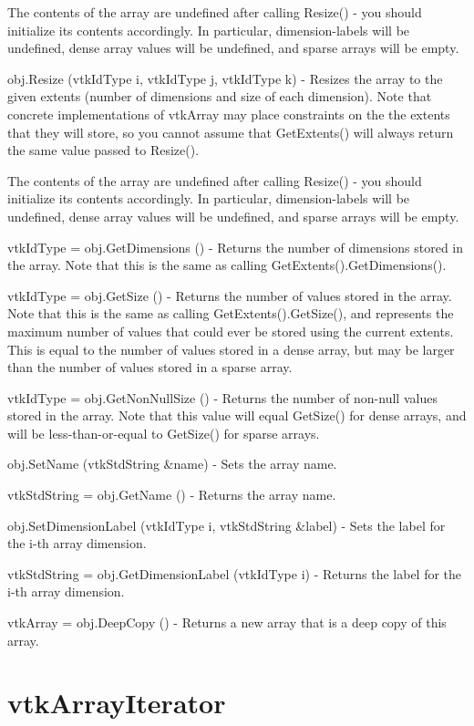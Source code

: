 \begin{DoxyItemize}
The contents of the array are undefined after calling Resize() -\/ you should initialize its contents accordingly. In particular, dimension-\/labels will be undefined, dense array values will be undefined, and sparse arrays will be empty.  
\item {\ttfamily obj.\-Resize (vtk\-Id\-Type i, vtk\-Id\-Type j, vtk\-Id\-Type k)} -\/ Resizes the array to the given extents (number of dimensions and size of each dimension). Note that concrete implementations of vtk\-Array may place constraints on the the extents that they will store, so you cannot assume that Get\-Extents() will always return the same value passed to Resize().

The contents of the array are undefined after calling Resize() -\/ you should initialize its contents accordingly. In particular, dimension-\/labels will be undefined, dense array values will be undefined, and sparse arrays will be empty.  
\item {\ttfamily vtk\-Id\-Type = obj.\-Get\-Dimensions ()} -\/ Returns the number of dimensions stored in the array. Note that this is the same as calling Get\-Extents().Get\-Dimensions().  
\item {\ttfamily vtk\-Id\-Type = obj.\-Get\-Size ()} -\/ Returns the number of values stored in the array. Note that this is the same as calling Get\-Extents().Get\-Size(), and represents the maximum number of values that could ever be stored using the current extents. This is equal to the number of values stored in a dense array, but may be larger than the number of values stored in a sparse array.  
\item {\ttfamily vtk\-Id\-Type = obj.\-Get\-Non\-Null\-Size ()} -\/ Returns the number of non-\/null values stored in the array. Note that this value will equal Get\-Size() for dense arrays, and will be less-\/than-\/or-\/equal to Get\-Size() for sparse arrays.  
\item {\ttfamily obj.\-Set\-Name (vtk\-Std\-String \&name)} -\/ Sets the array name.  
\item {\ttfamily vtk\-Std\-String = obj.\-Get\-Name ()} -\/ Returns the array name.  
\item {\ttfamily obj.\-Set\-Dimension\-Label (vtk\-Id\-Type i, vtk\-Std\-String \&label)} -\/ Sets the label for the i-\/th array dimension.  
\item {\ttfamily vtk\-Std\-String = obj.\-Get\-Dimension\-Label (vtk\-Id\-Type i)} -\/ Returns the label for the i-\/th array dimension.  
\item {\ttfamily vtk\-Array = obj.\-Deep\-Copy ()} -\/ Returns a new array that is a deep copy of this array.  
\end{DoxyItemize}\hypertarget{vtkcommon_vtkarrayiterator}{}\section{vtk\-Array\-Iterator}\label{vtkcommon_vtkarrayiterator}
